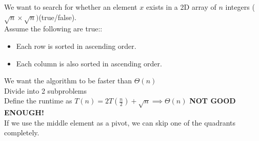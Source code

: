 \documentclass[12pt]{article}
\begin{document}
    We want to search for whether an element $x$ exists in a 2D array of $n$ integers ($\sqrt{n}\times \sqrt{n})$(true/false).\\

    Assume the following are true::
    \begin{itemize}
        \item Each row is sorted in ascending order.
        \item Each column is also sorted in ascending order.
    \end{itemize}

    We want the algorithm to be faster than $\Theta(n)$\\
    Divide into 2 subproblems\\
    Define the runtime as $T(n)=2T(\frac{n}{2})+\sqrt{n}\implies \Theta(n)$ \textbf{NOT GOOD ENOUGH!}\\
    If we use the middle element as a pivot, we can skip one of the quadrants completely.
\end{document}
